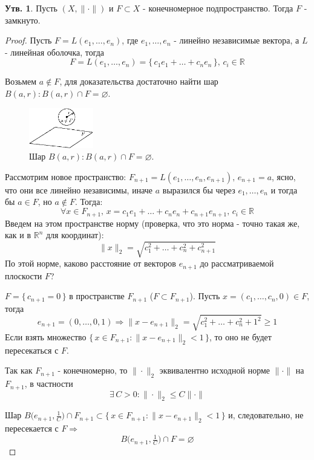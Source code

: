 \documentclass[12pt]{article}
\newcommand{\MR}{\mathbb{R}}
\newcommand{\VN}{\varnothing}
\theoremstyle{definition}
\newtheorem{prop}{Утв.}
\begin{document}
\begin{prop}
	Пусть $(X,\|\cdot\|)$ и $F \subset X$ - конечномерное подпространство. Тогда $F$ - замкнуто.
\end{prop}
\begin{proof}
	Пусть $F = L(e_1, \dotsc, e_n)$, где $e_1, \dotsc, e_n$ - линейно независимые вектора, а $L$ - линейная оболочка, тогда 
	$$ 
		F = L(e_1,\dotsc, e_n) = \{\,c_1 e_1 + \dotsc + c_n e_n \,\}, \, c_i \in \MR
	$$
	
	Возьмем $a \notin F$, для доказательства достаточно найти шар $B(a,r) \colon B(a,r) \cap F = \VN$. 
	\begin{figure}[H]
		\centering
		\includegraphics[width=0.25\textwidth]{7_2.eps}
		\caption{Шар $B(a,r) \colon B(a,r)\cap F = \VN$.}
		\label{7_2}
	\end{figure}
	Рассмотрим новое пространство: $F_{n+1} = L(e_1, \dotsc, e_n, e_{n+1}), \, e_{n+1} = a$, ясно, что они все линейно независимы, иначе $a$ выразился бы через $e_1, \dotsc, e_n$ и тогда бы $a \in F$, но $a \notin F$. Тогда:
	$$
		\forall x \in F_{n+1},\, x = c_1 e_1 + \dotsc + c_n e_n + c_{n+1} e_{n+1}, \, c_i \in \MR
	$$
	Введем на этом пространстве норму (проверка, что это норма - точно такая же, как и в $\MR^n$ для координат): 
	$$
		\|x\|_2 = \sqrt{c_1^2 + \dotsc + c_n^2 + c_{n+1}^2}
	$$
	По этой норме, каково расстояние от векторов $e_{n+1}$ до рассматриваемой плоскости $F$? 
	
	$F = \{\,c_{n+1} = 0 \,\}$ в пространстве $F_{n+1 }$ ($F \subset F_{n+1}$). Пусть $x = (c_1, \dotsc, c_n, 0) \in F$, тогда 
	$$
		e_{n+1} = (0,\dotsc, 0,1) \Rightarrow \|x - e_{n+1}\|_2 = \sqrt{c_1^2 + \dotsc + c_n^2 + 1^2} \geq 1 
	$$
	Если взять множество $\{\,x \in F_{n+1} \colon \|x - e_{n+1}\|_2 < 1 \,\}$, то оно не будет пересекаться с $F$. 
	
	Так как $F_{n+1}$ - конечномерно, то $\|\cdot\|_2$ эквивалентно исходной норме $\| \cdot \|$ на $F_{n+1}$, в частности 
	$$
		\exists \, C > 0 \colon \|\cdot \|_2 \leq C \|\cdot \|
	$$
	
	Шар $B\big(e_{n+1}, \tfrac{1}{C}\big) \cap F_{n+1} \subset \{\,x \in F_{n+1}\colon \|x - e_{n+1} \|_2 < 1  \,\}$ и, следовательно, не пересекается с $F \Rightarrow$
	$$
		B\big(e_{n+1}, \tfrac{1}{C}\big) \cap F = \VN
	$$
\end{proof}
\end{document}
